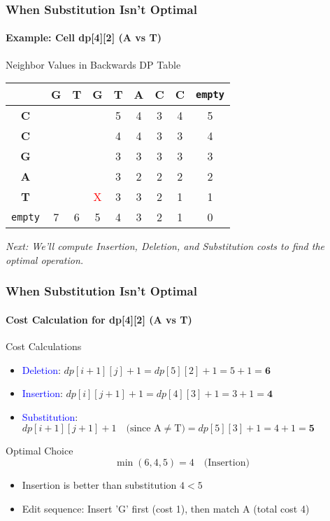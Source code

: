 \documentclass[10pt,aspectratio=43]{beamer}
\begin{document}
\begin{frame}
\frametitle{When Substitution Isn't Optimal}
\framesubtitle{Example: Cell dp[4][2] (A vs T)}

\begin{block}{Neighbor Values in Backwards DP Table}
\begin{center}
\scriptsize
\begin{tabular}{|c|c|c|c|c|c|c|c|c|}
\hline
 & \textbf{G} & \textbf{T} & \textbf{G} & \textbf{T} & \textbf{A} & \textbf{C} & \textbf{C} & \texttt{empty} \\ \hline
\textbf{C} &  &  &  & 5 & 4 & 3 & 4 & 5 \\ \hline
\textbf{C} &  &  &  & 4 & 4 & 3 & 3 & 4 \\ \hline
\textbf{G} &  &  &  & 3 & 3 & 3 & 3 & 3 \\ \hline
\textbf{A} &  &  &  & 3 & 2 & 2 & 2 & 2 \\ \hline
\textbf{T} &  &  & \textcolor{red}{X} & 3 & 3 & 2 & 1 & 1 \\ \hline
\texttt{empty} & 7 & 6 & 5 & 4 & 3 & 2 & 1 & 0 \\ \hline
\end{tabular}
\end{center}
\end{block}

\vspace{0.3cm}
\begin{center}
    \textit{Next: We'll compute Insertion, Deletion, and Substitution costs to find the optimal operation.}
\end{center}

\end{frame}

\begin{frame}
\frametitle{When Substitution Isn't Optimal}
\framesubtitle{Cost Calculation for dp[4][2] (A vs T)}

\begin{block}{Cost Calculations}
\begin{itemize}
\item \textcolor{blue}{Deletion}: $dp[i+1][j] + 1 = dp[5][2] + 1 = 5 + 1 = \textbf{6}$
\item \textcolor{blue}{Insertion}: $dp[i][j+1] + 1 = dp[4][3] + 1 = 3 + 1 = \textbf{4}$
\item \textcolor{blue}{Substitution}: $dp[i+1][j+1] + 1 \quad \text{(since A} \neq \text{T)} = dp[5][3] + 1 = 4 + 1 = \textbf{5}$
\end{itemize}
\end{block}

\vspace{0.3cm}
\begin{exampleblock}{Optimal Choice}
\[
\min(6, 4, 5) = \boxed{4} \quad \text{(Insertion)}
\]
\begin{itemize}
\item Insertion is better than substitution \( 4 < 5 \)
\item Edit sequence: Insert 'G' first (cost 1), then match A (total cost 4)
\end{itemize}
\end{exampleblock}

\end{frame}
\end{document}
